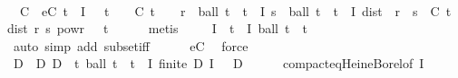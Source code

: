 \begin{isabellebody}
\ \ \isamarkupfalse%
\ {\isasymepsilon}\ C\ \ eC{\isacharcolon}{\kern0pt}\ {\isachardoublequoteopen}t\ {\isasymin}\ I\ {\isasymLongrightarrow}\ {\isasymepsilon}\ t\ {\isachargreater}{\kern0pt}\ {}\ {\isasymand}\ C\ t\ {\isasymge}\ {}\ {\isasymand}\ {\isacharparenleft}{\kern0pt}{\isasymforall}r\ {\isasymin}\ ball\ t\ {\isacharparenleft}{\kern0pt}{\isasymepsilon}\ t{\isacharparenright}{\kern0pt}\ {\isasyminter}\ I{\isachardot}{\kern0pt}\ {\isasymforall}s\ {\isasymin}\ ball\ t\ {\isacharparenleft}{\kern0pt}{\isasymepsilon}\ t{\isacharparenright}{\kern0pt}\ {\isasyminter}\ I{\isachardot}{\kern0pt}\ dist\ {\isacharparenleft}{\kern0pt}{\isasymphi}\ r{\isacharparenright}{\kern0pt}\ {\isacharparenleft}{\kern0pt}{\isasymphi}\ s{\isacharparenright}{\kern0pt}\ {\isasymle}\ C\ t\ {\isacharasterisk}{\kern0pt}\ dist\ r\ s\ powr\ {\isasymgamma}{\isacharparenright}{\kern0pt}{\isachardoublequoteclose}\ \ t\isanewline
\ \ \ \ \isamarkupfalse%
\ {\isacharparenleft}{\kern0pt}metis\ {\isacharasterisk}{\kern0pt}{\isacharparenleft}{\kern0pt}{}{\isacharparenright}{\kern0pt}{\isacharparenright}{\kern0pt}\isanewline
\ \ \isamarkupfalse%
\ {\isachardoublequoteopen}I\ {\isasymsubseteq}\ {\isacharparenleft}{\kern0pt}{\isasymUnion}t\ {\isasymin}\ I{\isachardot}{\kern0pt}\ ball\ t\ {\isacharparenleft}{\kern0pt}{\isasymepsilon}\ t{\isacharparenright}{\kern0pt}{\isacharparenright}{\kern0pt}{\isachardoublequoteclose}\isanewline
\ \ \ \ \isamarkupfalse%
\ {\isacharparenleft}{\kern0pt}auto\ simp\ add{\isacharcolon}{\kern0pt}\ subset{\isacharunderscore}{\kern0pt}iff{\isacharparenright}{\kern0pt}\isanewline
\ \ \ \ \isamarkupfalse%
\ eC\ \isamarkupfalse%
\ force\isanewline
\ \ \isamarkupfalse%
\ \isamarkupfalse%
\ D\ \ D{\isacharcolon}{\kern0pt}\ {\isachardoublequoteopen}D\ {\isasymsubseteq}\ {\isacharparenleft}{\kern0pt}{\isasymlambda}t{\isachardot}{\kern0pt}\ ball\ t\ {\isacharparenleft}{\kern0pt}{\isasymepsilon}\ t{\isacharparenright}{\kern0pt}{\isacharparenright}{\kern0pt}\ {\isacharbackquote}{\kern0pt}\ I{\isachardoublequoteclose}\ {\isachardoublequoteopen}finite\ D{\isachardoublequoteclose}\ {\isachardoublequoteopen}I\ {\isasymsubseteq}\ {\isasymUnion}\ D{\isachardoublequoteclose}\isanewline
\ \ \ \ \isamarkupfalse%
\ compact{\isacharunderscore}{\kern0pt}eq{\isacharunderscore}{\kern0pt}Heine{\isacharunderscore}{\kern0pt}Borel{\isacharbrackleft}{\kern0pt}of\ I{\isacharbrackright}{\kern0pt}\ \isamarkupfalse%

\end{isabellebody}
